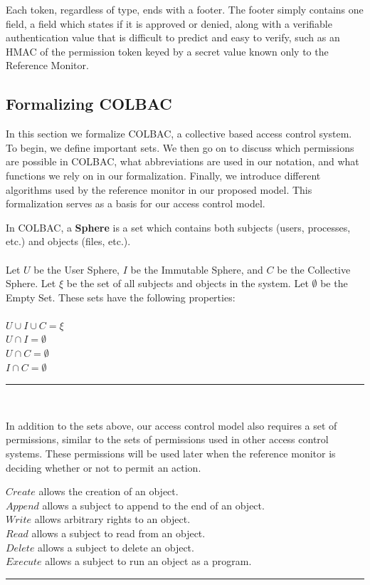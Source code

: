 Each token, regardless of type, ends with a footer. The footer simply contains
one field, a field which states if it is approved or denied, along with a
verifiable authentication value that is difficult to predict and easy to verify,
such as an HMAC of the permission token keyed by a secret value known only to
the Reference Monitor.

\subsection{Formalizing COLBAC}
\label{sec:colbacformal}
In this section we formalize COLBAC, a collective based access control system.
To begin, we define important sets. We then go on to discuss which permissions
are possible in COLBAC, what abbreviations are used in our notation, and what
functions we rely on in our formalization. Finally, we introduce different
algorithms used by the reference monitor in our proposed model. This
formalization serves as a basis for our access control model.
\begin{definition}\label{def:spheres}
In COLBAC, a \textbf{Sphere} is a set which contains both subjects (users,
processes, etc.) and objects (files, etc.).\\
\mbox{}\\
Let $U$ be the User Sphere, $I$ be the Immutable Sphere, and $C$ be the
Collective Sphere. Let $\xi$ be the set of all subjects and objects in the
system. Let $\emptyset$ be the Empty Set. These sets have the following
properties:\\
\mbox{}\\
$U \cup I \cup C = \xi$\\
$U \cap I = \emptyset$\\
$U \cap C = \emptyset$\\
$I \cap C = \emptyset$\\
\hrule \mbox{}\\
\end{definition}

\noindent In addition to the sets above, our access control model also requires
a set of permissions, similar to the sets of permissions used in other access
control systems. These permissions will be used later when the reference monitor
is deciding whether or not to permit an action.

\begin{definition}\label{def:permissions}
$Create$ allows the creation of an object.\\
$Append$ allows a subject to append to the end of an object.\\
$Write$ allows arbitrary rights to an object. \\
$Read$ allows a subject to read from an object.\\
$Delete$ allows a subject to delete an object. \\
$Execute$ allows a subject to run an object as a program.\\
\hrule \mbox{}\\
\end{definition}

